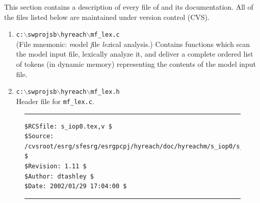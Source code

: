 This section contains a description of every file of
\swname{} and its documentation.  All of the files listed
below are maintained under version control (CVS).

\begin{enumerate}
\item {}%
      \texttt{c:$\backslash$swprojsb$\backslash$hyreach$\backslash$mf\_lex.c} \\
      (File mnemonic:  \emph{m}odel \emph{f}ile \emph{lex}ical analysis.)  Contains functions
      which scan the model input file, lexically analyze it, and deliver a 
      complete ordered list of tokens (in dynamic
      memory) representing the contents of the model input file.
\item {}%
      \texttt{c:$\backslash$swprojsb$\backslash$hyreach$\backslash$mf\_lex.h} \\
      Header file for \texttt{mf\_lex.c}.
\end{enumerate}


\noindent\begin{figure}[!b]
\noindent\rule[-0.25in]{\textwidth}{1pt}
\begin{tiny}
\begin{verbatim}
$RCSfile: s_iop0.tex,v $
$Source: /cvsroot/esrg/sfesrg/esrgpcpj/hyreach/doc/hyreachm/s_iop0/s_iop0.tex,v $
$Revision: 1.11 $
$Author: dtashley $
$Date: 2002/01/29 17:04:00 $
\end{verbatim}
\end{tiny}
\noindent\rule[0.25in]{\textwidth}{1pt}
\end{figure}
%
%
%
%
%
%
%
%
%
%
%
